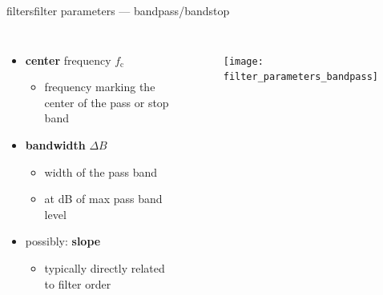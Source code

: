        \begin{frame}{filters}{filter parameters --- bandpass/bandstop}
            \begin{columns}
                \begin{itemize}
                    \item   \textbf{center} frequency $f_\mathrm{c}$
                        \begin{itemize}
                            \item   frequency marking the center of the pass or stop band
                        \end{itemize}
                    \smallskip
                    \item   \textbf{bandwidth} $\Delta B$
                        \begin{itemize}
                            \item   width of the pass band
                            \item   at \unit[-3]{dB} of max pass band level
                        \end{itemize}
                    \smallskip
                    \item   possibly: \textbf{slope}    
                        \begin{itemize}
                            \item   typically directly related to filter order
                        \end{itemize}
                \end{itemize}
                \begin{figure}%
                    \texttt{[image: filter\_parameters\_bandpass]}%
                \end{figure}
            \end{columns}
        \end{frame}
